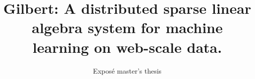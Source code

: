 \documentclass{dima}
\begin{document}

\title{Gilbert: A distributed sparse linear algebra system for machine learning on web-scale data.}
\subtitle{Exposé master's thesis}


%
%
%
%


\author{
%
%
}
\end{document}
